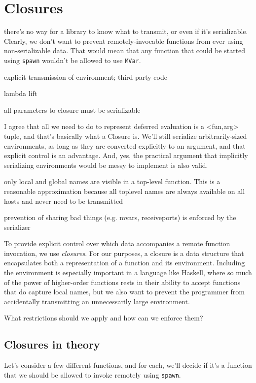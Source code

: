 \documentclass[preprint]{sigplanconf}
\begin{document}
\section{Closures}
there's no way for a library to know what to transmit, or even if it's serializable. Clearly, we don't want to prevent remotely-invocable functions from ever using non-serializable data. That would mean that any function that could be started using \texttt{spawn} wouldn't be allowed to use \texttt{MVar}.

explicit transmission of environment; third party code

lambda lift

all parameters to closure must be serializable

I agree that all we need to do to represent deferred evaluation is a
<fun,arg> tuple, and that's basically what a Closure is. We'll still
serialize arbitrarily-sized environments, as long as they are
converted explicitly to an argument, and that explicit control is an
advantage. And, yes, the practical argument that implicitly
serializing environments would be messy to implement is also valid.

only local and global names are visible in a top-level function. This is a reasonable approximation because all toplevel names are always available on all hosts and never need to be transmitted

prevention of sharing bad things (e.g. mvars, receiveports) is enforced by the serializer

To provide explicit control over which data accompanies a remote function invocation, we use {\em closures}. For our purposes, a closure is a data structure that encapsulates both a representation of a function and its environment. Including the environment is especially important in a language like Haskell, where so much of the power of higher-order functions rests in their ability to accept functions that do capture local names, but we also want to prevent the programmer from accidentally transmitting an unnecessarily large environment.

What restrictions should we apply and how can we enforce them?

\subsection{Closures in theory}

Let's consider a few different functions, and for each, we'll decide if it's a function that we should be allowed to invoke remotely using \texttt{spawn}. 
\end{document}
